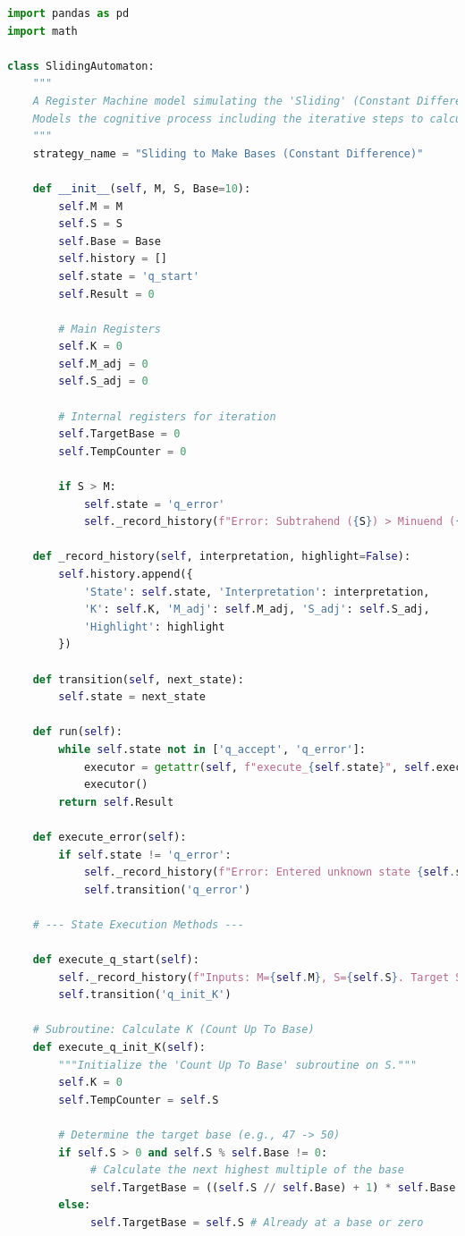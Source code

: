 \documentclass[11pt]{article}
\begin{document}
\begin{lstlisting}[language=Python]
import pandas as pd
import math

class SlidingAutomaton:
    """
    A Register Machine model simulating the 'Sliding' (Constant Difference) strategy.
    Models the cognitive process including the iterative steps to calculate the adjustment K.
    """
    strategy_name = "Sliding to Make Bases (Constant Difference)"

    def __init__(self, M, S, Base=10):
        self.M = M
        self.S = S
        self.Base = Base
        self.history = []
        self.state = 'q_start'
        self.Result = 0

        # Main Registers
        self.K = 0
        self.M_adj = 0
        self.S_adj = 0

        # Internal registers for iteration
        self.TargetBase = 0
        self.TempCounter = 0

        if S > M:
            self.state = 'q_error'
            self._record_history(f"Error: Subtrahend ({S}) > Minuend ({M}).")

    def _record_history(self, interpretation, highlight=False):
        self.history.append({
            'State': self.state, 'Interpretation': interpretation,
            'K': self.K, 'M_adj': self.M_adj, 'S_adj': self.S_adj,
            'Highlight': highlight
        })

    def transition(self, next_state):
        self.state = next_state

    def run(self):
        while self.state not in ['q_accept', 'q_error']:
            executor = getattr(self, f"execute_{self.state}", self.execute_error)
            executor()
        return self.Result

    def execute_error(self):
        if self.state != 'q_error':
            self._record_history(f"Error: Entered unknown state {self.state}")
            self.transition('q_error')

    # --- State Execution Methods ---

    def execute_q_start(self):
        self._record_history(f"Inputs: M={self.M}, S={self.S}. Target S for adjustment.", highlight=True)
        self.transition('q_init_K')

    # Subroutine: Calculate K (Count Up To Base)
    def execute_q_init_K(self):
        """Initialize the 'Count Up To Base' subroutine on S."""
        self.K = 0
        self.TempCounter = self.S

        # Determine the target base (e.g., 47 -> 50)
        if self.S > 0 and self.S % self.Base != 0:
             # Calculate the next highest multiple of the base
             self.TargetBase = ((self.S // self.Base) + 1) * self.Base
        else:
             self.TargetBase = self.S # Already at a base or zero


\end{lstlisting}
\end{document}
